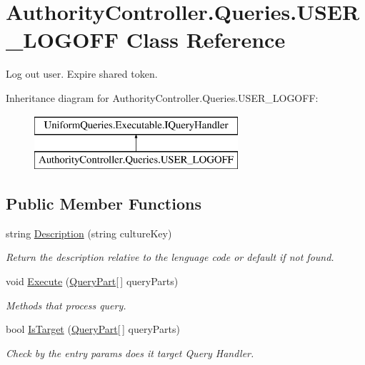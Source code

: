 \hypertarget{class_authority_controller_1_1_queries_1_1_u_s_e_r___l_o_g_o_f_f}{}\section{Authority\+Controller.\+Queries.\+U\+S\+E\+R\+\_\+\+L\+O\+G\+O\+FF Class Reference}
\label{class_authority_controller_1_1_queries_1_1_u_s_e_r___l_o_g_o_f_f}


Log out user. Expire shared token.  


Inheritance diagram for Authority\+Controller.\+Queries.\+U\+S\+E\+R\+\_\+\+L\+O\+G\+O\+FF\+:\begin{figure}[H]
\begin{center}
\leavevmode
\includegraphics[height=2.000000cm]{db/d2a/class_authority_controller_1_1_queries_1_1_u_s_e_r___l_o_g_o_f_f}
\end{center}
\end{figure}
\subsection*{Public Member Functions}
\begin{DoxyCompactItemize}
\item 
string \mbox{\hyperlink{class_authority_controller_1_1_queries_1_1_u_s_e_r___l_o_g_o_f_f_a2cb738d74699241341b691cc55b57e1d}{Description}} (string culture\+Key)
\begin{DoxyCompactList}\small\item\em Return the description relative to the lenguage code or default if not found. \end{DoxyCompactList}\item 
void \mbox{\hyperlink{class_authority_controller_1_1_queries_1_1_u_s_e_r___l_o_g_o_f_f_a2e4d5a0f8ee93210522c41a38adbcce2}{Execute}} (\mbox{\hyperlink{struct_uniform_queries_1_1_query_part}{Query\+Part}}\mbox{[}$\,$\mbox{]} query\+Parts)
\begin{DoxyCompactList}\small\item\em Methods that process query. \end{DoxyCompactList}\item 
bool \mbox{\hyperlink{class_authority_controller_1_1_queries_1_1_u_s_e_r___l_o_g_o_f_f_afbfa78117d68ab2bd2728c78d31c1c58}{Is\+Target}} (\mbox{\hyperlink{struct_uniform_queries_1_1_query_part}{Query\+Part}}\mbox{[}$\,$\mbox{]} query\+Parts)
\begin{DoxyCompactList}\small\item\em Check by the entry params does it target Query Handler. \end{DoxyCompactList}\end{DoxyCompactItemize}
